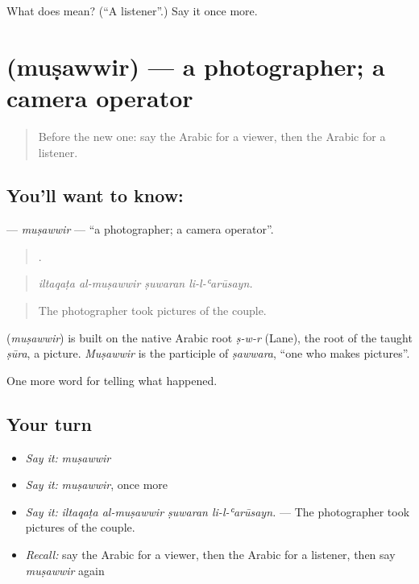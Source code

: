 \begin{tcolorbox}[breakable,colback=teal!4,colframe=teal!35!black,title={Before you move on}]
What does  mean? (\textquotedblleft{}A listener\textquotedblright{}.) Say it once more.
\end{tcolorbox}
\section[\texorpdfstring{\ar{مصور} (muṣawwir)}{مصور (muṣawwir)}]{ (muṣawwir) — a photographer; a camera operator}

\label{lesson:AR-C356-musawwir}



\begin{quote}
Before the new one: say the Arabic for a viewer, then the Arabic for a listener.
\end{quote}

\subsection*{You'll want to know: }
\textbf{} — \emph{muṣawwir} — \textquotedblleft{}a photographer; a camera operator\textquotedblright{}.

\begin{quote}
   .
\end{quote}

\begin{quote}
\emph{iltaqaṭa al-muṣawwir ṣuwaran li-l-ʿarūsayn.}
\end{quote}

\begin{quote}
The photographer took pictures of the couple.
\end{quote}

\begin{cousinweb}
\textbf{} (\emph{muṣawwir}) is built on the native Arabic root \emph{ṣ-w-r} (Lane), the root of the taught \emph{ṣūra}, a picture. \emph{Muṣawwir} is the participle of \emph{ṣawwara}, \textquotedblleft{}one who makes pictures\textquotedblright{}.
\end{cousinweb}

\begin{grammarlens}[title={What you've built}]
One more word for telling what happened.
\end{grammarlens}

\subsection*{Your turn}
\begin{itemize}
\raggedright
  \item \emph{Say it:} \emph{muṣawwir}
  \item \emph{Say it:} \emph{muṣawwir}, once more
  \item \emph{Say it:} \emph{iltaqaṭa al-muṣawwir ṣuwaran li-l-ʿarūsayn.} — The photographer took pictures of the couple.
  \item \emph{Recall:} say the Arabic for a viewer, then the Arabic for a listener, then say \emph{muṣawwir} again
\end{itemize}

